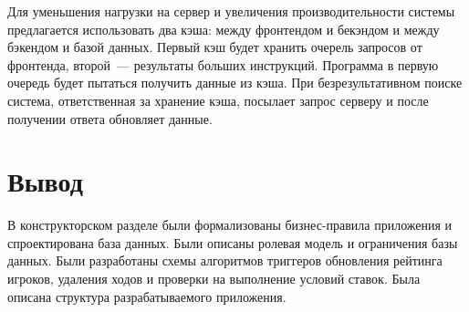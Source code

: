 Для уменьшения нагрузки на сервер и увеличения производительности системы предлагается использовать два кэша: между фронтендом и бекэндом и между бэкендом и базой данных.
Первый кэш будет хранить очерель запросов от фронтенда, второй~--- результаты больших инструкций.
Программа в первую очередь будет пытаться получить данные из кэша.
При безрезультативном поиске система, ответственная за хранение кэша, посылает запрос серверу и после получении ответа обновляет данные.

\section*{Вывод}

В конструкторском разделе были формализованы бизнес-правила приложения и спроектирована база данных. Были описаны ролевая модель и ограничения базы данных. Были разработаны схемы алгоритмов триггеров обновления рейтинга игроков, удаления ходов и проверки на выполнение условий ставок. Была описана структура разрабатываемого приложения.

\clearpage
